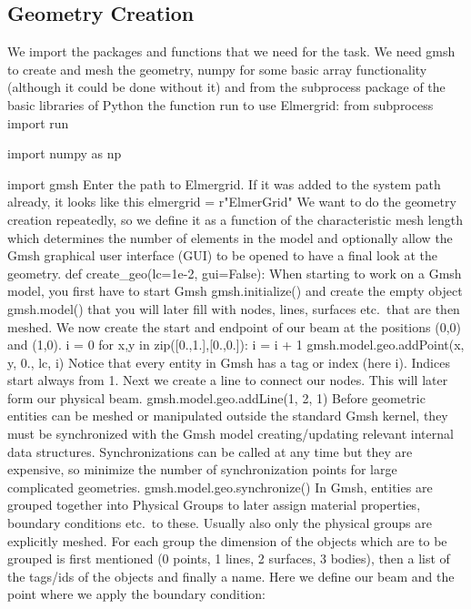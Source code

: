 \subsection*{Geometry Creation}
We import the packages and functions that we need for the task. We need gmsh to create and mesh the geometry, numpy for some basic array functionality (although it could be done without it) and from the subprocess package of the basic libraries of Python the function run to use Elmergrid:
\ttbegin
from subprocess import run

import numpy as np

import gmsh 
\ttend
Enter the path to Elmergrid. If it was added to the system path already, it looks like this
\ttbegin 
elmergrid = r"ElmerGrid"
\ttend
We want to do the geometry creation repeatedly, so we define it as a function of the characteristic mesh length which determines the number of elements in the model and optionally allow the Gmsh graphical user interface (GUI) to be opened to have a final look at the geometry. 
\ttbegin 
def create_geo(lc=1e-2, gui=False):
\ttend
When starting to work on a Gmsh model, you first have to start Gmsh
\ttbegin
gmsh.initialize()
\ttend
and create the empty object 
\ttbegin
gmsh.model()
\ttend
that you will later fill with nodes, lines, surfaces etc.\ that are then meshed. We now create the start and endpoint of our beam at the positions (0,0) and (1,0). 
\ttbegin
i = 0
for x,y in zip([0.,1.],[0.,0.]):
    i = i + 1    
    gmsh.model.geo.addPoint(x, y, 0., lc, i) 
\ttend
Notice that every entity in Gmsh has a tag or index (here i). Indices start always from 1. Next we create a line to connect our nodes. This will later form our physical beam.
\ttbegin
gmsh.model.geo.addLine(1, 2, 1)
\ttend
Before geometric entities can be meshed or manipulated outside the standard Gmsh kernel, they must be synchronized with the Gmsh model creating/updating relevant internal data structures. Synchronizations can be called at any time but they are expensive, so minimize the number of synchronization points for large complicated geometries. 
\ttbegin
gmsh.model.geo.synchronize()
\ttend
In Gmsh, entities are grouped together into Physical Groups to later assign material properties, boundary conditions etc.\ to these. Usually also only the physical groups are explicitly meshed. For each group the dimension of the objects which are to be grouped is first mentioned (0 points, 1 lines, 2 surfaces, 3 bodies), then a list of the tags/ids of the objects and finally a name. Here we define our beam and the point where we apply the boundary condition:
